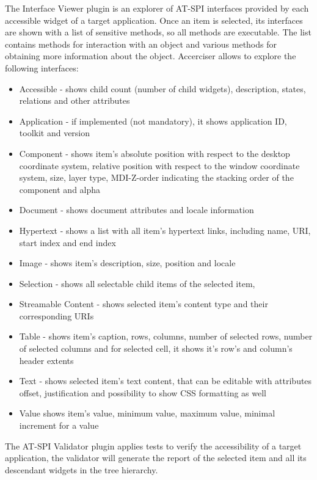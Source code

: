 The Interface Viewer plugin is an explorer of AT-SPI interfaces provided by each accessible widget of a target application. Once an item is selected, its interfaces are shown with a list of sensitive methods, so all methods are executable. The list contains methods for interaction with an object and various methods for obtaining more information about the object. Accerciser allows to explore the following interfaces:
    \begin{itemize}
        \item Accessible - shows child count (number of child widgets), description, states, relations and other attributes
        \item Application - if implemented (not mandatory), it shows application ID, toolkit and version
        \item Component - shows item's absolute position with respect to the desktop coordinate system, relative position with respect to the  window coordinate system, size, layer type, MDI-Z-order indicating the stacking order of the component and alpha
        \item Document - shows document attributes and locale information
        \item Hypertext - shows a list with all item's hypertext links,  including name, URI, start index and end index
        \item Image - shows item's description, size, position and locale
        \item Selection - shows all selectable child items of the selected item,
        \item Streamable Content - shows selected item's content type and their corresponding URIs
        \item Table - shows item's caption, rows, columns, number of selected rows, number of selected columns and for selected cell, it shows  it's row's and column's header extents  
        \item Text - shows selected item's text content, that can be editable with attributes offset, justification  and possibility to show CSS formatting as well
        \item Value shows item's value, minimum value, maximum value, minimal increment for a value 
    \end{itemize}
    
The AT-SPI Validator plugin applies tests to verify the accessibility of a target application, the validator will generate the report of the selected item and all its descendant widgets in the tree hierarchy.

